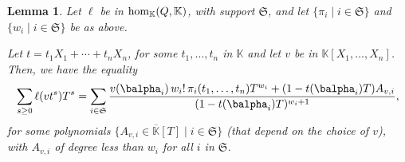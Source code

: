 \documentclass[12pt]{article}
\newtheorem{Lemma}{Lemma}
\def\K {\ensuremath{\mathbb{K}}}
\def\Kbar {{\ensuremath{\overline{\mathbb{K}}}}}
\def\K{\mathbb{K}}
\begin{document}
\begin{Lemma}\label{lemma:formula}
	Let $\ell$ be in ${\rm hom}_\K(Q,\K)$, with support $\mathfrak{S}$,
	and let $\{\pi_i \mid i \in \mathfrak{S}\}$ and $\{w_i \mid i \in
	\mathfrak{S}\}$ be as above.
	
	Let $t=t_1 X_1 + \cdots +t_n X_n$, for some $t_1,\dots,t_n$ in $\K$
	and let $v$ be in $\K[X_1,\dots,X_n]$. Then, we have the equality
	\begin{align}\label{eq:sumgenseries}
	\sum_{s \ge 0} \ell(v t^s)T^s =
	\sum_{i \in \mathfrak{S}} \frac{
		v(\balpha_i)\, w_i!\, \pi_{i}(t_1,\dots,t_n)
		T^{w_i} + (1-t(\balpha_i)    T)A_{v,i}}
	{(1-t(\balpha_i) T)^{w_{i}+1}},    
	\end{align}
	for some polynomials $\{A_{v,i} \in \Kbar[T] \mid i \in \mathfrak{S}\}$ (that
	depend on the choice of $v$), with $A_{v,i}$ of degree less than $w_i$ for all $i$ in
	$\mathfrak{S}$.
\end{Lemma}
\end{document}
